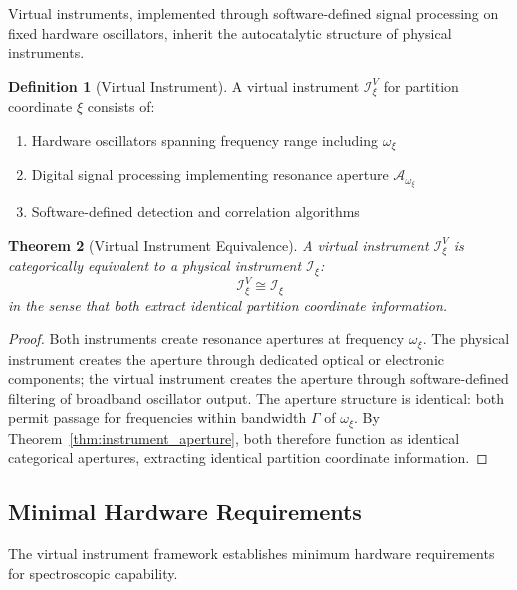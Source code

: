 \documentclass[twocolumn,10pt,a4paper]{article}
\newtheorem{theorem}{Theorem}[section]
\theoremstyle{definition}
\newtheorem{definition}[theorem]{Definition}
\theoremstyle{remark}
\newcommand{\aperture}{\mathcal{A}}
\newcommand{\instrument}{\mathcal{I}}
\begin{document}
Virtual instruments, implemented through software-defined signal processing on fixed hardware oscillators, inherit the autocatalytic structure of physical instruments.

\begin{definition}[Virtual Instrument]
\label{def:virtual_instrument}
A virtual instrument $\instrument^V_\xi$ for partition coordinate $\xi$ consists of:
\begin{enumerate}
\item Hardware oscillators spanning frequency range including $\omega_\xi$
\item Digital signal processing implementing resonance aperture $\aperture_{\omega_\xi}$
\item Software-defined detection and correlation algorithms
\end{enumerate}
\end{definition}

\begin{theorem}[Virtual Instrument Equivalence]
\label{thm:virtual_equivalence}
A virtual instrument $\instrument^V_\xi$ is categorically equivalent to a physical instrument $\instrument_\xi$:
\begin{equation}
\instrument^V_\xi \cong \instrument_\xi
\end{equation}
in the sense that both extract identical partition coordinate information.
\end{theorem}

\begin{proof}
Both instruments create resonance apertures at frequency $\omega_\xi$. The physical instrument creates the aperture through dedicated optical or electronic components; the virtual instrument creates the aperture through software-defined filtering of broadband oscillator output. The aperture structure is identical: both permit passage for frequencies within bandwidth $\Gamma$ of $\omega_\xi$. By Theorem~\ref{thm:instrument_aperture}, both therefore function as identical categorical apertures, extracting identical partition coordinate information.
\end{proof}

\subsection{Minimal Hardware Requirements}

The virtual instrument framework establishes minimum hardware requirements for spectroscopic capability.
\end{document}
